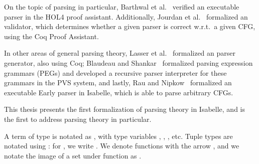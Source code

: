 \begin{isabellebody}
\begin{isamarkuptext}
On the topic of  parsing in particular, Barthwal et al.~\cite{Barthwal} verified an executable
 parser in the HOL4 proof assistant. Additionally, Jourdan et al.~\cite{Jourdan} formalized an
 validator, which determines whether a given  parser is correct w.r.t.\ a given CFG,
using the Coq Proof Assistant. 

In other areas of general parsing theory, Lasser et al.~\cite{Lasser} formalized an  parser
generator, also using Coq; Blaudeau and Shankar~\cite{Blaudeau} formalized parsing expression grammars
(PEGs) and developed a recursive parser interpreter for these grammars in the PVS system, and lastly,
Rau and Nipkow~\cite{Rau} formalized an executable Early parser in Isabelle, which is able
to parse arbitrary CFGs.

This thesis presents the first formalization of  parsing theory in Isabelle, and is the first
to address  parsing theory in particular.%
\end{isamarkuptext}\isamarkuptrue%
%
\isadelimdocument
%
\endisadelimdocument
%
\isatagdocument
%
\isamarkuptrue%
%
\isamarkuptrue%
%
\endisatagdocument
{\isafolddocument}%
%
\isadelimdocument
%
\endisadelimdocument
%
\begin{isamarkuptext}%
A term  of type \isa{{\isasymtau}} is notated as , with type variables , ,
, etc. Tuple types are notated using \isa{{\isasymtimes}}: for , we write
. We denote functions with the arrow \isa{{\isasymRightarrow}}, and we notate the
image of a set  under function  as .


\end{isamarkuptext}
\end{isabellebody}
